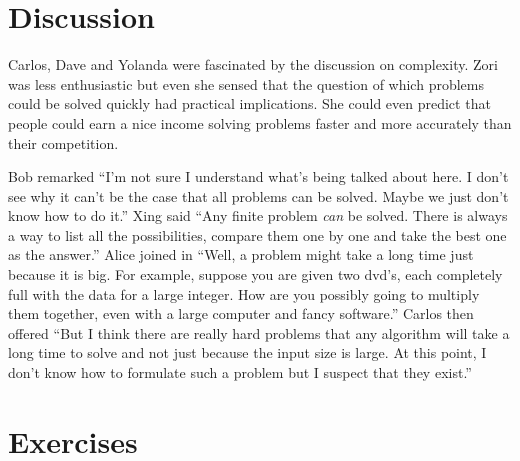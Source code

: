 \section{Discussion}

Carlos, Dave and Yolanda were fascinated by the discussion on complexity.
Zori was less enthusiastic but even 
she sensed that the question of which problems could be solved quickly
had practical implications. She could even predict that people could
earn a nice income solving problems faster and more accurately
than their competition.

Bob remarked ``I'm not sure I understand what's being talked about
here.  I don't see why it can't be the  case that all problems
can be solved.  Maybe we just don't know how to do it.''
Xing said ``Any finite problem \textit{can} be solved.  There
is always a way to list all the possibilities, compare them
one by one and take the best one as the answer.''
Alice joined in ``Well, a problem might take a long time
just because it is big.  For example, suppose you are given
two dvd's, each completely full with the data for a large integer.
How are you possibly going to multiply them together, even
with a large computer and fancy software.''  Carlos then
offered ``But I think there are really hard problems that
any algorithm will take a long time to solve and not just
because the input size is large.  At this point, I don't know how 
to formulate such a problem but I suspect that they exist.''

\section{Exercises}\label{s:basics:exercises}

